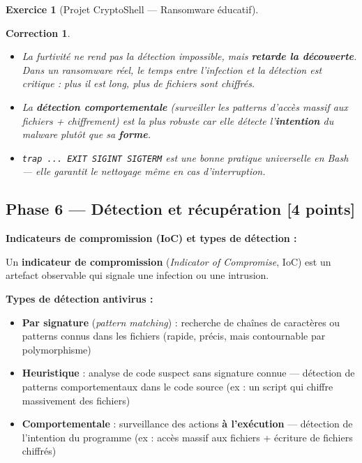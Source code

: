 \documentclass[a4paper,11pt]{article}
\theoremstyle{plain}
\newtheorem{correction}{Correction}
\theoremstyle{definition}
\newtheorem{exercice}{Exercice}
\begin{document}
\begin{exercice}[Projet CryptoShell --- Ransomware éducatif]
\begin{correction}
\begin{pointcle}
\begin{itemize}
    \item La furtivité ne rend pas la détection impossible, mais \textbf{retarde la découverte}. Dans un ransomware réel, le temps entre l'infection et la détection est critique : plus il est long, plus de fichiers sont chiffrés.
    \item La \textbf{détection comportementale} (surveiller les patterns d'accès massif aux fichiers + chiffrement) est la plus robuste car elle détecte l'\textbf{intention} du malware plutôt que sa \textbf{forme}.
    \item \texttt{trap ... EXIT SIGINT SIGTERM} est une bonne pratique universelle en Bash --- elle garantit le nettoyage même en cas d'interruption.
\end{itemize}
\end{pointcle}

\end{correction}



\subsection*{Phase 6 --- Détection et récupération \hfill \normalsize [4 points]}

\begin{rappel}
\textbf{Indicateurs de compromission (IoC) et types de détection :}

Un \textbf{indicateur de compromission} (\textit{Indicator of Compromise}, IoC) est un artefact observable qui signale une infection ou une intrusion.

\medskip
\textbf{Types de détection antivirus :}
\begin{itemize}
    \item \textbf{Par signature} (\textit{pattern matching}) : recherche de chaînes de caractères ou patterns connus dans les fichiers (rapide, précis, mais contournable par polymorphisme)
    \item \textbf{Heuristique} : analyse de code suspect sans signature connue --- détection de patterns comportementaux dans le code source (ex : un script qui chiffre massivement des fichiers)
    \item \textbf{Comportementale} : surveillance des actions \textbf{à l'exécution} --- détection de l'intention du programme (ex : accès massif aux fichiers + écriture de fichiers chiffrés)
\end{itemize}


\end{rappel}
\end{exercice}
\end{document}
